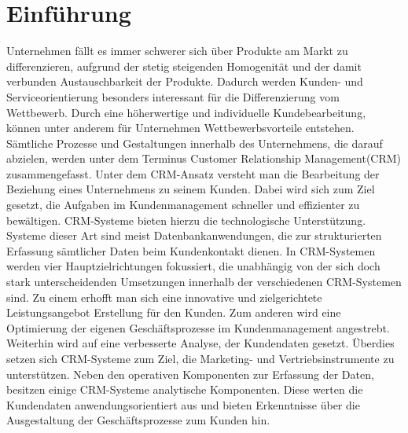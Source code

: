 \chapter{Einführung}
\label{ch:Einfuehrung}

Unternehmen fällt es immer schwerer sich über Produkte am Markt zu differenzieren, aufgrund der stetig steigenden Homogenität und der damit verbunden Austauschbarkeit der Produkte. Dadurch werden Kunden- und Serviceorientierung besonders interessant für die Differenzierung vom Wettbewerb. Durch eine höherwertige und individuelle Kundebearbeitung, können unter anderem für Unternehmen Wettbewerbsvorteile entstehen. Sämtliche Prozesse und Gestaltungen innerhalb des Unternehmens, die darauf abzielen, werden unter dem Terminus Customer Relationship Management(CRM) zusammengefasst. Unter dem CRM-Ansatz versteht man die Bearbeitung der Beziehung eines Unternehmens zu seinem Kunden. Dabei wird sich zum Ziel gesetzt, die Aufgaben im Kundenmanagement schneller und effizienter zu bewältigen. CRM-Systeme bieten hierzu die technologische Unterstützung. Systeme dieser Art sind meist Datenbankanwendungen, die zur strukturierten Erfassung sämtlicher Daten beim Kundenkontakt dienen. In CRM-Systemen werden vier Hauptzielrichtungen fokussiert, die unabhängig von der sich doch stark unterscheidenden Umsetzungen innerhalb der verschiedenen CRM-Systemen sind. Zu einem erhofft man sich eine innovative und zielgerichtete Leistungsangebot Erstellung für den Kunden. Zum anderen wird eine Optimierung der eigenen Geschäftsprozesse im Kundenmanagement angestrebt. Weiterhin wird auf eine verbesserte Analyse, der Kundendaten gesetzt. Überdies setzen sich CRM-Systeme zum Ziel, die Marketing- und Vertriebsinstrumente zu unterstützen. Neben den operativen Komponenten zur Erfassung der Daten, besitzen einige CRM-Systeme analytische Komponenten. Diese werten die Kundendaten anwendungsorientiert aus und bieten Erkenntnisse über die Ausgestaltung der Geschäftsprozesse zum Kunden hin.

